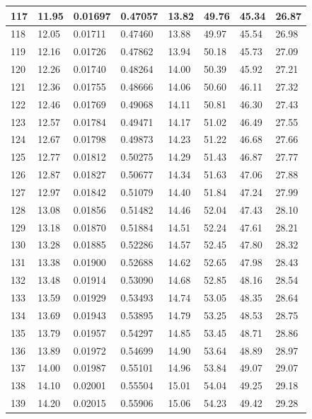 \documentclass[12pt,a4paper,twoside]{article}
\begin{document}
\begin{center}
\begin{longtable}{l l l l | l l l l}
117 & 11.95 & 0.01697 & 0.47057 & 13.82 & 49.76 & 45.34 & 26.87 \\ \hline
118 & 12.05 & 0.01711 & 0.47460 & 13.88 & 49.97 & 45.54 & 26.98 \\ \hline
119 & 12.16 & 0.01726 & 0.47862 & 13.94 & 50.18 & 45.73 & 27.09 \\ \hline
120 & 12.26 & 0.01740 & 0.48264 & 14.00 & 50.39 & 45.92 & 27.21 \\ \hline
121 & 12.36 & 0.01755 & 0.48666 & 14.06 & 50.60 & 46.11 & 27.32 \\ \hline
122 & 12.46 & 0.01769 & 0.49068 & 14.11 & 50.81 & 46.30 & 27.43 \\ \hline
123 & 12.57 & 0.01784 & 0.49471 & 14.17 & 51.02 & 46.49 & 27.55 \\ \hline
124 & 12.67 & 0.01798 & 0.49873 & 14.23 & 51.22 & 46.68 & 27.66 \\ \hline
125 & 12.77 & 0.01812 & 0.50275 & 14.29 & 51.43 & 46.87 & 27.77 \\ \hline
126 & 12.87 & 0.01827 & 0.50677 & 14.34 & 51.63 & 47.06 & 27.88 \\ \hline
127 & 12.97 & 0.01842 & 0.51079 & 14.40 & 51.84 & 47.24 & 27.99 \\ \hline
128 & 13.08 & 0.01856 & 0.51482 & 14.46 & 52.04 & 47.43 & 28.10 \\ \hline
129 & 13.18 & 0.01870 & 0.51884 & 14.51 & 52.24 & 47.61 & 28.21 \\ \hline
130 & 13.28 & 0.01885 & 0.52286 & 14.57 & 52.45 & 47.80 & 28.32 \\ \hline
131 & 13.38 & 0.01900 & 0.52688 & 14.62 & 52.65 & 47.98 & 28.43 \\ \hline
132 & 13.48 & 0.01914 & 0.53090 & 14.68 & 52.85 & 48.16 & 28.54 \\ \hline
133 & 13.59 & 0.01929 & 0.53493 & 14.74 & 53.05 & 48.35 & 28.64 \\ \hline
134 & 13.69 & 0.01943 & 0.53895 & 14.79 & 53.25 & 48.53 & 28.75 \\ \hline
135 & 13.79 & 0.01957 & 0.54297 & 14.85 & 53.45 & 48.71 & 28.86 \\ \hline
136 & 13.89 & 0.01972 & 0.54699 & 14.90 & 53.64 & 48.89 & 28.97 \\ \hline
137 & 14.00 & 0.01987 & 0.55101 & 14.96 & 53.84 & 49.07 & 29.07 \\ \hline
138 & 14.10 & 0.02001 & 0.55504 & 15.01 & 54.04 & 49.25 & 29.18 \\ \hline
139 & 14.20 & 0.02015 & 0.55906 & 15.06 & 54.23 & 49.42 & 29.28 \\ \hline

\end{longtable}
\end{center}
\end{document}
